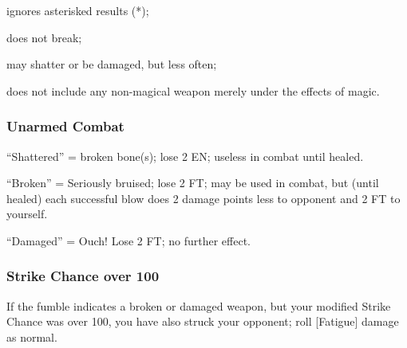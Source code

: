 \begin{multicols*}{3}
\begin{Itemize}
\item ignores asterisked results (*);

\item does not break;

\item may shatter or be damaged, but less often;

\item does not include any non-magical weapon merely under the effects of magic.
\end{Itemize}

\subsubsection{Unarmed Combat}

\begin{Itemize}
\item ``Shattered'' = broken bone(s); lose 2 EN; useless in combat
until healed.

\item ``Broken'' = Seriously bruised; lose 2 FT; may be used in
combat, but (until healed) each successful blow does 2 damage points
less to opponent and 2 FT to yourself.

\item ``Damaged'' = Ouch! Lose 2 FT; no further effect.
\end{Itemize}

\subsubsection{Strike Chance over 100}

If the fumble indicates a broken or damaged weapon, but your modified
Strike Chance was over 100, you have also struck your opponent; roll
[Fatigue] damage as normal.
\end{multicols*}
